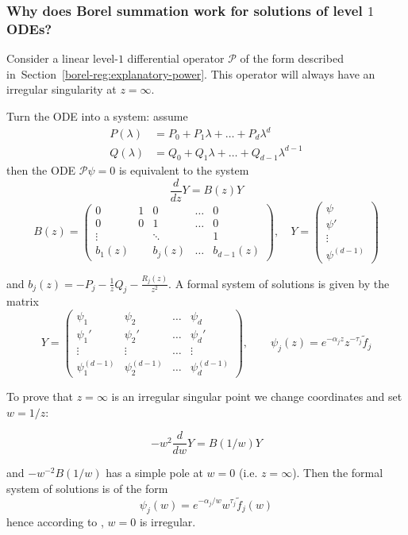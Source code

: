\documentclass{article}
\theoremstyle{definition}
\theoremstyle{plain}
\newenvironment{verify}{\color{ForestGreen}}{\color{black}}
\begin{document}
\subsubsection{Why does Borel summation work for solutions of level $1$ ODEs?}\label{sec:why_borel_ODE}
%
Consider a linear level-$1$ differential operator $\mathcal{P}$ of the form described in~Section~\ref{borel-reg:explanatory-power}. This operator will always have an irregular singularity at $z = \infty$.
\begin{verify}
\par
Turn the ODE into a system: assume 
\begin{align*}
P(\lambda) & = P_0 + P_1 \lambda + \ldots + P_d \lambda^d \\
Q(\lambda) & = Q_0 + Q_1 \lambda + \ldots + Q_{d-1} \lambda^{d-1}
\end{align*}
then the ODE $\mathcal{P}\psi=0$ is equivalent to the system 
    \begin{equation}
        \frac{d}{dz}Y= B(z) Y 
    \end{equation}
    \[
    B(z)=\begin{pmatrix}
            0 & 1 & 0 & \ldots & 0 \\
            0 & 0 & 1 & \ldots & 0 \\
            \vdots & &\ddots & & 1\\
            b_{1}(z) & & b_j(z) & \ldots & b_{d-1}(z)
        \end{pmatrix}, \quad Y=\begin{pmatrix}
            \psi \\
            \psi ' \\
            \vdots \\
            \psi^{(d-1)}
        \end{pmatrix}
    \]
    
 and $b_j(z)=-P_j-\frac{1}{z}Q_j-\frac{R_j(z)}{z^2}$. A formal system of solutions is given by the matrix 
\begin{equation}
    Y=\begin{pmatrix}
       \psi_1 & \psi_2 & \ldots & \psi_d  \\
       \psi_1' & \psi_2' & \ldots & \psi_d'  \\
       \vdots & \vdots  & \ldots & \vdots  \\
       \psi_1^{(d-1)} & \psi_2^{(d-1)} & \ldots & \psi_d^{(d-1)} 
    \end{pmatrix}, \qquad \psi_j(z)=e^{-\alpha_j z}z^{-\tau_j}\tilde{f}_j
\end{equation} 

To prove that $z=\infty$ is an irregular singular point we change coordinates and set $w=1/z$:  

 \begin{equation}
        -w^2 \frac{d}{dw}Y= B(1/w) Y 
    \end{equation}

and $-w^{-2}B(1/w)$ has a simple pole at $w=0$ (i.e. $z=\infty$). Then the formal system of solutions is of the form 
\[\psi_j(w)=e^{-\alpha_j/w} w^{\tau_j} \tilde{f}_j(w)\]
hence according to \cite[Definition 3.3.2]{diverg-resurg--ii}, $w=0$ is irregular.
\par
\end{verify}
\end{document}

